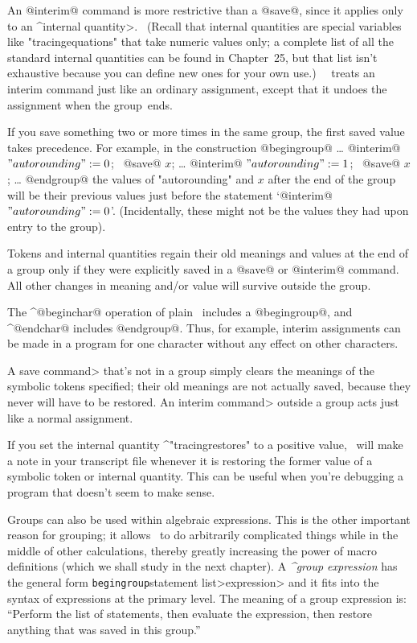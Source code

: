 {{{{\danger An @interim@ command is more restrictive than a @save@, since it
applies only to an ^\<internal quantity>. \ (Recall that internal
quantities are special variables like "tracingequations" that take numeric
values only; a complete list of all the standard internal quantities can
be found in Chapter~25, but that list isn't exhaustive because you can
define new ones for your own use.) \ \MF\ treats an interim command just
like an ordinary assignment, except that it undoes the assignment when the
group~ends.

\danger If you save something two or more times in the same group,
the first saved value takes precedence. For example, in the construction
\begindisplay
@begingroup@\cr
\noalign{\vskip-3pt}\dots\cr
@interim@ $"autorounding":=0$; \ @save@ $x$;\cr
\noalign{\vskip-3pt}\dots\cr
@interim@ $"autorounding":=1$; \ @save@ $x$;\cr
\noalign{\vskip-3pt}\dots\cr
@endgroup@\cr
\enddisplay
the values of "autorounding" and $x$ after the end of the group will be
their previous values just before the statement `@interim@ $"autorounding":=0$'.
(Incidentally, these might not be the values they had upon entry to the group).

\danger Tokens and internal quantities regain their old meanings and
values at the end of a group only if they were explicitly saved in a
@save@ or @interim@ command. All other changes in meaning and/or value
will survive outside the group.

\danger The ^@beginchar@ operation of plain \MF\ includes a @begingroup@,
and ^@endchar@ includes @endgroup@. Thus, for example, interim assignments
can be made in a program for one character without any effect on other
characters.

\danger A \<save command> that's not in a group simply clears the meanings
of the symbolic tokens specified; their old meanings are not actually saved,
because they never will have to be restored. An \<interim command>
outside a group acts just like a normal assignment.

\danger If you set the internal quantity ^"tracingrestores" to a positive
value, \MF\ will make a note in your transcript file whenever it is
restoring the former value of a symbolic token or internal quantity.
This can be useful when you're debugging a program that doesn't seem
to make sense.

Groups can also be used within algebraic expressions. This is
the other important reason for grouping; it allows \MF\ to do arbitrarily
complicated things while in the middle of other calculations, thereby
greatly increasing the power of macro definitions (which we shall study
in the next chapter). A {\sl^{group expression}\/} has the general form
\begindisplay
{\tt begingroup}\thinspace\<statement list>\thinspace\<expression>
\enddisplay
and it fits into the syntax of expressions at the primary level. The
meaning of a group expression is: ``Perform the list of statements,
then evaluate the expression, then restore anything that was saved
in this group.''

}}}}
